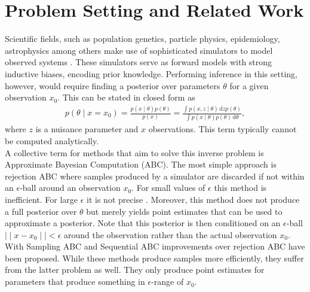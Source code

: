 \documentclass[12pt]{article}
\title{\vskip-3em \bf 
	Simulation-based Inference
    }
\author{
    A Summary Written by Stefan Wezel \\
    \texttt{stefan.wezel@student.uni-tuebingen.de}
}
\date{\it Machine Learning for and with Dynamical Systems\\Summer Term 2021}
\newcommand{\diff}{\,\text{d}}
\begin{document}
\maketitle



\section*{Problem Setting and Related Work}
Scientific fields, such as population genetics, particle physics, epidemiology, astrophysics among others make use of sophisticated simulators to model observed systems \citep{brehmer2020simulation, de2020simulation, delaunoy2020lightning,cranmer2020frontier, pritchard1999population}. These simulators serve as forward models with strong inductive biases, encoding prior knowledge. Performing inference in this setting, however, would require finding a posterior over parameters $\theta$ for a given observation $x_0$. This can be stated in closed form as 
\begin{align}
	p(\theta\mid x=x_0) = \frac{p(x\mid \theta)p(\theta)}{p(x)} = \frac{\int p(x,z\mid \theta)\diff z p(\theta)}{\int p(x\mid \theta)p(\theta) \diff \theta},
\end{align}
where $z$ is a nuisance parameter and $x$ observations. This term typically cannot be computed analytically.\\
A collective term for methods that aim to solve this inverse problem is Approximate Bayesian Computation (ABC). The most simple approach is rejection ABC \citep{pritchard1999population} where samples produced by a simulator are discarded if not within an $\epsilon$-ball around an observation $x_0$. For small values of $\epsilon$ this method is inefficient. For large $\epsilon$ it is not precise \citep{papamakarios2016fast}. Moreover, this method does not produce a full posterior over $\theta$ but merely yields point estimates that can be used to approximate a posterior. Note that this posterior is then conditioned on an $\epsilon$-ball $\mid\mid x-x_0 \mid\mid < \epsilon$ around the observation rather than the actual observation $x_0$.\\
With Sampling ABC \citep{marjoram2003markov} and Sequential ABC \citep{beaumont2009adaptive,bonassi2015sequential} improvements over rejection ABC have been proposed. While these methods produce samples more efficiently, they suffer from the latter problem as well. They only produce point estimates for parameters that produce something in $\epsilon$-range of $x_0$.
\end{document}
